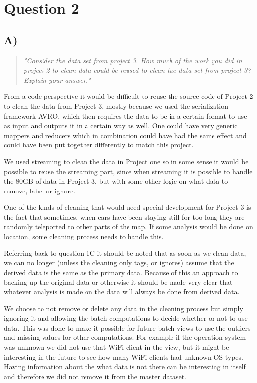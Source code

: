 \section{Question 2}

\subsection{A)}
\begin{quote}
	\textit{"Consider	the	data	set	from	project	3.	How	much	of	the	work	you	did	in	project	2	to	clean	data	could	be	reused	to	clean	the	data	set	from	project	3?	Explain	your	answer."}
\end{quote}
From a code perspective it would be difficult to reuse the source code of Project 2 to clean the data from Project 3, mostly because we used the serialization framework AVRO, which then requires the data to be in a certain format to use as input and outputs it in a certain way as well. One could have very generic mappers and reducers which in combination could have had the same effect and could have been put together differently to match this project. 

\newpar We used streaming to clean the data in Project one so in some sense it would be possible to reuse the streaming part, since when streaming it is possible to handle the 80GB of data in Project 3, but with some other logic on what data to remove, label or ignore.

\newpar One of the kinds of cleaning that would need special development for Project 3 is the fact that sometimes, when cars have been staying still for too long they are randomly teleported to other parts of the map. If some analysis would be done on location, some cleaning process needs to handle this.

\newpar Referring back to question 1C it should be noted that as soon as we clean data, we can no longer (unless the cleaning only tags, or ignores) assume that the derived data is the same as the primary data. Because of this an approach to backing up the original data or otherwise it should be made very clear that whatever analysis is made on the data will always be done from derived data.

\newpar We choose to not remove or delete any data in the cleaning process but simply ignoring it and allowing the batch computations to decide whether or not to use data. This was done to make it possible for future batch views to use the outliers and missing values for other computations. For example if the operation system was unknown we did not use that WiFi client in the view, but it might be interesting in the future to see how many WiFi clients had unknown OS types. Having information about the what data is not there can be interesting in itself and therefore we did not remove it from the master dataset.

